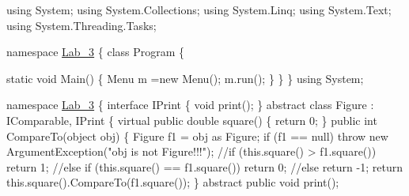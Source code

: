 \begin{DoxyCode}
﻿using System;
\textcolor{keyword}{using} System.Collections;
\textcolor{keyword}{using} System.Linq;
\textcolor{keyword}{using} System.Text;
\textcolor{keyword}{using} System.Threading.Tasks;

\textcolor{keyword}{namespace }\hyperlink{namespace_lab__3}{Lab\_3}
\{
    \textcolor{keyword}{class }Program
    \{

        \textcolor{keyword}{static} \textcolor{keywordtype}{void} Main()
        \{
            Menu m =\textcolor{keyword}{new} Menu();
            m.run();
        \}
    \}
\}
﻿using System;

\textcolor{keyword}{namespace }\hyperlink{namespace_lab__3}{Lab\_3}
\{
    \textcolor{keyword}{interface }IPrint
    \{
        \textcolor{keywordtype}{void} print();
    \}
    \textcolor{keyword}{abstract} \textcolor{keyword}{class }Figure : IComparable, IPrint
    \{
        \textcolor{keyword}{virtual} \textcolor{keyword}{public} \textcolor{keywordtype}{double} square() \{ \textcolor{keywordflow}{return} 0; \}
        \textcolor{keyword}{public} \textcolor{keywordtype}{int} CompareTo(\textcolor{keywordtype}{object} obj)
        \{
            Figure f1 = obj as Figure;
            \textcolor{keywordflow}{if} (f1 == null)
                \textcolor{keywordflow}{throw} \textcolor{keyword}{new} ArgumentException(\textcolor{stringliteral}{"obj is not Figure!!!"});
            \textcolor{comment}{//if (this.square() > f1.square()) return 1;}
            \textcolor{comment}{//else if (this.square() == f1.square()) return 0;}
            \textcolor{comment}{//else return -1;}
            \textcolor{keywordflow}{return} this.square().CompareTo(f1.square());
        \}
        \textcolor{keyword}{abstract} \textcolor{keyword}{public} \textcolor{keywordtype}{void} print();


\end{DoxyCode}
